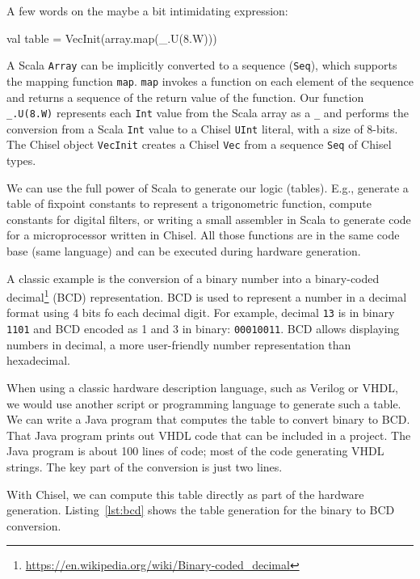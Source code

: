\documentclass[%
    10pt,
    headinclude, footexclude,
    openright, %
    notitlepage,
    cleardoubleempty,
    headsepline,
    pointlessnumbers,
    bibtotoc, idxtotoc,
    ]{scrbook}
\newcommand{\code}[1]{{\small{\texttt{#1}}}}
\newcommand{\myref}[2]{\href{#1}{#2}}
\renewcommand{\myref}[2]{{#2}{\footnote{\url{#1}}}}
\begin{document}
A few words on the maybe a bit intimidating expression:
\begin{chisel}
  val table = VecInit(array.map(_.U(8.W)))
\end{chisel}

\noindent A Scala \code{Array} can be implicitly converted to a sequence (\code{Seq}),
which supports the mapping function \code{map}.
\code{map} invokes a function on each element of the sequence and returns
a sequence of the return value of the function. Our function \code{\_.U(8.W)} represents
each \code{Int} value from the Scala array as a \code{\_} and performs the conversion
from a Scala \code{Int} value to a Chisel \code{UInt} literal, with a size of 8-bits.
The Chisel object \code{VecInit} creates a Chisel \code{Vec} from a sequence \code{Seq}
of Chisel types.



We can use the full power of Scala to generate our logic (tables).
E.g., generate a table of fixpoint constants to represent a trigonometric function,
compute constants for digital filters, or writing a small assembler in Scala
to generate code for a microprocessor written in Chisel. All those functions
are in the same code base (same language) and can be executed during
hardware generation.

A classic example is the conversion of a binary number
into a \myref{https://en.wikipedia.org/wiki/Binary-coded_decimal}{binary-coded decimal}
(BCD) representation. BCD is used to represent a number in a decimal
format using 4 bits fo each decimal digit. For example, decimal \code{13} is in binary
\code{1101} and BCD encoded as 1 and 3 in binary: \code{00010011}.
BCD allows displaying numbers in decimal, a more user-friendly number
representation than hexadecimal.

When using a classic hardware description language, such as Verilog or VHDL,
we would use another script or programming language to generate such a table.
We can write a Java program that computes the table to convert binary to BCD.
That Java program prints out VHDL code that can be included in a project.
The Java program is about 100 lines of code; most of the code generating
VHDL strings. The key part of the conversion is just two lines.

With Chisel, we can compute this table directly as part of the hardware generation.
Listing~\ref{lst:bcd} shows the table generation for the binary to BCD conversion.
\end{document}
